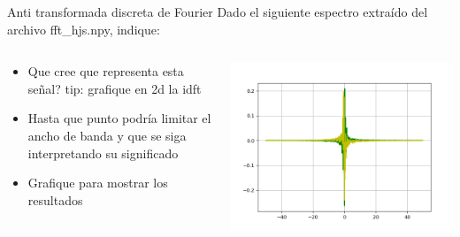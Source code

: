  \begin{frame}{Anti transformada discreta de Fourier}
  Dado el siguiente espectro extraído del archivo fft\_hjs.npy, indique:
   \begin{columns}[c]
      \hspace{2pt}
      \begin{column}{.6\textwidth}
    \begin{itemize}
       \item{Que cree que representa esta señal?  \footnotesize{tip: grafique en 2d la idft}}
       \item{Hasta que punto podría limitar el ancho de banda y que se siga interpretando su significado}
       \item{Grafique para mostrar los resultados}
    \end{itemize}
      \end{column}
      \hspace{2pt}
      \vrule
      \begin{column}{.4\textwidth}
         \centering\includegraphics[width=1.0\textwidth]{tp2/homer}
      \end{column}
      \hspace{2pt}
   \end{columns}
 \end{frame}
